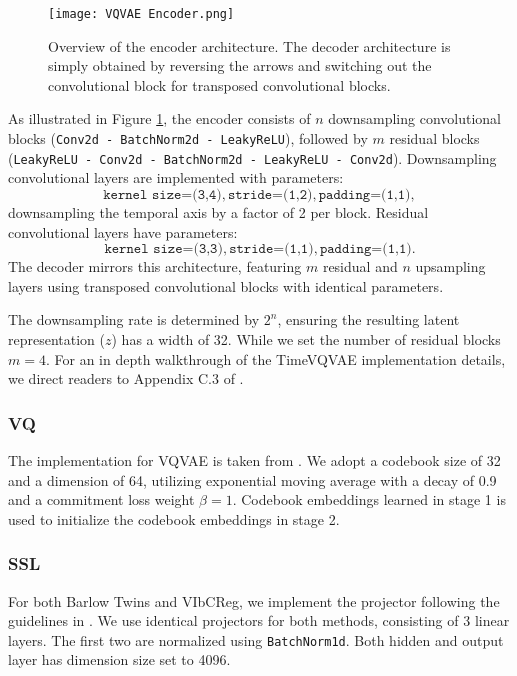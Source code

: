 \documentclass[../../thesis.tex]{subfiles}
\begin{document}
\begin{figure}[h]
    \texttt{[image: VQVAE Encoder.png]}
    \centering
    \caption{Overview of the encoder architecture. The decoder architecture is simply obtained by reversing the arrows and switching out the convolutional block for transposed convolutional blocks.}
    \label{fig:VQVAE Encoder}
\end{figure}
As illustrated in Figure \ref{fig:VQVAE Encoder}, the encoder consists of $n$ downsampling convolutional blocks (\texttt{Conv2d - BatchNorm2d - LeakyReLU}), followed by $m$ residual blocks (\texttt{LeakyReLU - Conv2d - BatchNorm2d - LeakyReLU - Conv2d}). Downsampling convolutional layers are implemented with parameters: 
\[\texttt{kernel size=(3,4)}, \texttt{stride=(1,2)}, \texttt{padding=(1,1)},\] downsampling the temporal axis by a factor of 2 per block. Residual convolutional layers have parameters: 
\[\texttt{kernel size=(3,3)},\texttt{stride=(1,1)}, \texttt{padding=(1,1)}.\]
The decoder mirrors this architecture, featuring $m$ residual and $n$ upsampling layers using transposed convolutional blocks with identical parameters.\newline

The downsampling rate is determined by $2^n$, ensuring the resulting latent representation ($z$) has a width of 32. While we set the number of residual blocks $m = 4$. For an in depth walkthrough of the TimeVQVAE implementation details, we direct readers to Appendix C.3 of \cite{TimeVQVAE}.


\subsubsection{VQ}
The implementation for VQVAE is taken from \cite{VQrepo}. We adopt a codebook size of 32 and a dimension of 64, utilizing exponential moving average with a decay of 0.9 and a commitment loss weight $\beta = 1$. Codebook embeddings learned in stage 1 is used to initialize the codebook embeddings in stage 2. 

\subsubsection{SSL}
For both Barlow Twins and VIbCReg, we implement the projector following the guidelines in \cite{lee2024computer}. We use identical projectors for both methods, consisting of 3 linear layers. The first two are normalized using \texttt{BatchNorm1d}. Both hidden and output layer has dimension size set to 4096.\newline
\end{document}
